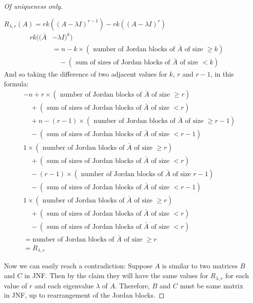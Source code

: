 \documentclass[../Main.tex]{subfiles}
\begin{document}
\begin{proof}[Of uniqueness only]
\begin{subproof}{$R_{\lambda, r}(A) = rk((A - \lambda I)^{r-1}) - rk((A - \lambda I)^r)$}
\begin{align*}
            rk((\bar{A} &- \lambda I)^k) \\
            &= n - k \times (\text{ number of Jordan blocks of $\bar{A}$ of size $\geq k$}) \\
                &\quad -(\text{ sum of sizes of Jordan blocks of $\bar{A}$ of size $< k$})
        \end{align*}
        And so taking the difference of two adjacent values for $k$, $r$ and $r-1$, in this formula:
        \begin{align*}
            & - n + r \times (\text{ number of Jordan blocks of $\bar{A}$ of size $\geq r$}) \\
                &\quad +(\text{ sum of sizes of Jordan blocks of $\bar{A}$ of size $< r$}) \\
                &\quad + n - (r-1) \times (\text{ number of Jordan blocks of $\bar{A}$ of size $\geq r-1$}) \\
                &\quad -(\text{ sum of sizes of Jordan blocks of $\bar{A}$ of size $< r-1$}) \\
            & 1 \times (\text{ number of Jordan blocks of $\bar{A}$ of size $\geq r$}) \\
                &\quad +(\text{ sum of sizes of Jordan blocks of $\bar{A}$ of size $< r$}) \\
                &\quad - (r-1) \times (\text{ number of Jordan blocks of $\bar{A}$ of size $r-1$}) \\
                &\quad -(\text{ sum of sizes of Jordan blocks of $\bar{A}$ of size $< r-1$}) \\
            & 1 \times (\text{ number of Jordan blocks of $\bar{A}$ of size $\geq r$}) \\
                &\quad +(\text{ sum of sizes of Jordan blocks of $\bar{A}$ of size $< r$}) \\
                &\quad -(\text{ sum of sizes of Jordan blocks of $\bar{A}$ of size $< r$}) \\
            &= \text{number of Jordan blocks of $\bar{A}$ of size $\geq r$} \\
            &= R_{\lambda, r}
        \end{align*}
    \end{subproof}
    Now we can easily reach a contradiction:
    Suppose $A$ is similar to two matrices $B$ and $C$ in JNF. Then by the claim they will have the same values for $R_{\lambda, r}$ for each value of $r$ and each eigenvalue $\lambda$ of $A$. Therefore, $B$ and $C$ must be same matrix in JNF, up to rearrangement of the Jordan blocks.
\end{proof}
\end{document}
